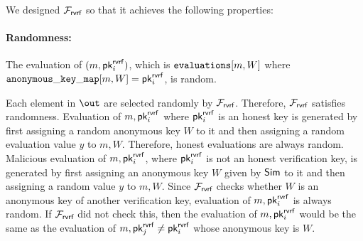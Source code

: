 %
%

We designed $ \mathcal{F}_{\textsf{rvrf}} $ so that it achieves the following properties:

\paragraph{Randomness:}  The evaluation of $ (m, \mathsf{pk}^{\mathsf{rvrf}}_i) $,  which is $ \texttt{evaluations}[m,W] $ where $ \mathtt{anonymous\_key\_map}[m,W] = \mathsf{pk}^{\mathsf{rvrf}}_i $, is random.


Each element in $ \out $ are selected randomly by $ \mathcal{F}_{\textsf{rvrf}} $. Therefore, $ \mathcal{F}_{\textsf{rvrf}} $ satisfies randomness.  Evaluation of $ m, \mathsf{pk}^{\mathsf{rvrf}}_i $ where $ \mathsf{pk}^{\mathsf{rvrf}}_i $ is an honest key is generated by first assigning a random anonymous key $ W $ to it and then assigning a random evaluation value $ y $ to $ m, W $. Therefore, honest evaluations are always random. Malicious evaluation of $ m, \mathsf{pk}^{\mathsf{rvrf}}_i $, where $ \mathsf{pk}^{\mathsf{rvrf}}_i $ is not an honest verification key, is generated by first assigning an anonymous key $ W $ given by $ \mathsf{Sim} $ to it and then assigning a random value $ y $ to $ m, W $. Since $ \mathcal{F}_{\textsf{rvrf}} $ checks whether $ W $ is an anonymous key of another verification key, evaluation of $ m, \mathsf{pk}^{\mathsf{rvrf}}_i $ is always random. If $ \mathcal{F}_{\textsf{rvrf}} $ did not check this, then the evaluation of $ m, \mathsf{pk}^{\mathsf{rvrf}}_i $ would be the same as the evaluation of $ m, \mathsf{pk}^{\mathsf{rvrf}}_j  \neq \mathsf{pk}^{\mathsf{rvrf}}_i$ whose anonymous key is $ W $.


